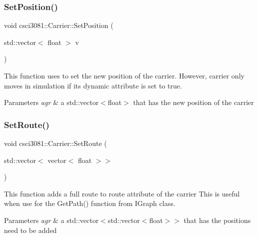 \subsubsection{\texorpdfstring{Set\+Position()}{SetPosition()}}
{\footnotesize\ttfamily void csci3081\+::\+Carrier\+::\+Set\+Position (\begin{DoxyParamCaption}\item[{std\+::vector$<$ float $>$}]{v }\end{DoxyParamCaption})}



This function uses to set the new position of the carrier. However, carrier only moves in simulation if its dynamic attribute is set to true. 


\begin{DoxyParams}{Parameters}
{\em agr} & a std\+::vector$<$float$>$ that has the new position of the carrier \\
\hline
\end{DoxyParams}
\mbox{\label{classcsci3081_1_1Carrier_a0b8c743cb8ab7843a4cece11225634f4}} 
\subsubsection{\texorpdfstring{Set\+Route()}{SetRoute()}}
{\footnotesize\ttfamily void csci3081\+::\+Carrier\+::\+Set\+Route (\begin{DoxyParamCaption}\item[{std\+::vector$<$ vector$<$ float $>$$>$}]{ }\end{DoxyParamCaption})}



This function adds a full route to route attribute of the carrier This is useful when use for the Get\+Path() function from I\+Graph class. 


\begin{DoxyParams}{Parameters}
{\em agr} & a std\+::vector$<$std\+::vector$<$float$>$$>$ that has the positions need to be added \\
\hline
\end{DoxyParams}
\mbox{\label{classcsci3081_1_1Carrier_a1f74a376887685a69b3d0512eb97188e}} 
